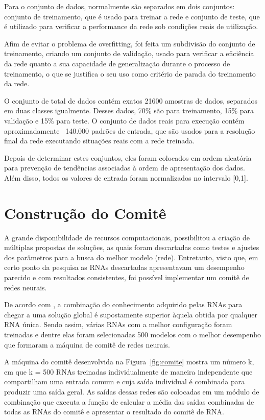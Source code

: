 Para o conjunto de dados, normalmente são separados em dois conjuntos: conjunto de treinamento, que é usado para treinar a rede e conjunto de teste, que é utilizado para verificar a performance da rede sob condições reais de utilização. 

Afim de evitar o problema de overfitting, foi feita um subdivisão do conjunto de treinamento, criando um conjunto de validação, usado para verificar a eficiência da rede quanto a sua capacidade de generalização durante o processo de treinamento, o que se justifica o seu uso como critério de parada do treinamento da rede.

O conjunto de total de dados contém exatos 21600 amostras de dados, separados em duas classes igualmente. Desses dados, 70\% são para treinamento, 15\% para validação e 15\% para teste. O conjunto de dados reais para execução contém aproximadamente ~140.000 padrões de entrada, que são usados para a resolução final da rede executando situações reais com a rede treinada.

Depois de determinar estes conjuntos, eles foram colocados em ordem aleatória para prevenção de tendências associadas à ordem de apresentação dos dados. Além disso, todos os valores de entrada foram normalizados no intervalo [0,1].

\section{Construção do Comitê}
\label{sec:comite}

A grande disponibilidade de recursos computacionais, possibilitou a criação de múltiplas propostas de soluções, as quais foram descartadas como testes e ajustes dos parâmetros para a busca do melhor modelo (rede). Entretanto, visto que, em certo ponto da pesquisa as RNAs descartadas apresentavam um desempenho parecido e com resultados consistentes, foi possível implementar um comitê de redes neurais.

De acordo com \cite{haykin2011neural}, a combinação do conhecimento adquirido pelas RNAs para chegar a uma solução global é supostamente superior àquela obtida por qualquer RNA única. Sendo assim, várias RNAs com a melhor configuração foram treinadas e dentre elas foram selecionadas 500 modelos com o melhor desempenho que formaram a máquina de comitê de redes neurais.

A máquina do comitê desenvolvida na Figura~\ref{fig:comite} mostra um número k, em que k = 500 RNAs treinadas individualmente de maneira independente que compartilham uma entrada comum e cuja saída individual é combinada para produzir uma saída geral. As saídas dessas redes são colocadas em um módulo de combinação que executa a função de calcular a média das saídas combinadas de todas as RNAs do comitê e apresentar o resultado do comitê de RNA.

